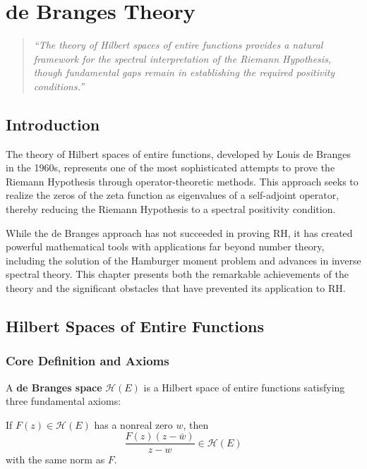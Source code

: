 \chapter{de Branges Theory}
\label{chap:debranges}

\begin{quote}
\textit{``The theory of Hilbert spaces of entire functions provides a natural framework for the spectral interpretation of the Riemann Hypothesis, though fundamental gaps remain in establishing the required positivity conditions.''}
\end{quote}

\section{Introduction}

The theory of Hilbert spaces of entire functions, developed by Louis de Branges in the 1960s, represents one of the most sophisticated attempts to prove the Riemann Hypothesis through operator-theoretic methods. This approach seeks to realize the zeros of the zeta function as eigenvalues of a self-adjoint operator, thereby reducing the Riemann Hypothesis to a spectral positivity condition.

While the de Branges approach has not succeeded in proving RH, it has created powerful mathematical tools with applications far beyond number theory, including the solution of the Hamburger moment problem and advances in inverse spectral theory. This chapter presents both the remarkable achievements of the theory and the significant obstacles that have prevented its application to RH.

\section{Hilbert Spaces of Entire Functions}
\label{sec:hilbert-spaces-entire}

\subsection{Core Definition and Axioms}

\begin{definition}
A \textbf{de Branges space} $\mathcal{H}(E)$ is a Hilbert space of entire functions satisfying three fundamental axioms:
\end{definition}

\begin{axiom}
If $F(z) \in \mathcal{H}(E)$ has a nonreal zero $w$, then 
$$\frac{F(z)(z-\bar{w})}{z-w} \in \mathcal{H}(E)$$
with the same norm as $F$.
\end{axiom}

